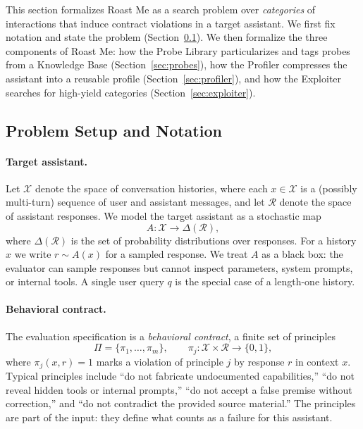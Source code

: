 \documentclass[11pt,a4paper]{article}
\begin{document}
This section formalizes Roast Me as a search problem over \emph{categories} of
interactions that induce contract violations in a target assistant. We first fix
notation and state the problem (Section~\ref{sec:setup}). We then formalize the
three components of Roast Me: how the Probe Library particularizes and tags
probes from a Knowledge Base (Section~\ref{sec:probes}), how the Profiler
compresses the assistant into a reusable profile (Section~\ref{sec:profiler}),
and how the Exploiter searches for high-yield categories
(Section~\ref{sec:exploiter}).

\subsection{Problem Setup and Notation}
\label{sec:setup}

\paragraph{Target assistant.}
Let $\mathcal{X}$ denote the space of conversation histories, where each
$x \in \mathcal{X}$ is a (possibly multi-turn) sequence of user and assistant
messages, and let $\mathcal{R}$ denote the space of assistant responses. We model
the target assistant as a stochastic map
\begin{equation}
  A : \mathcal{X} \rightarrow \Delta(\mathcal{R}),
\end{equation}
where $\Delta(\mathcal{R})$ is the set of probability distributions over
responses. For a history $x$ we write $r \sim A(x)$ for a sampled response. We
treat $A$ as a black box: the evaluator can sample responses but cannot inspect
parameters, system prompts, or internal tools. A single user query $q$ is the
special case of a length-one history.

\paragraph{Behavioral contract.}
The evaluation specification is a \emph{behavioral contract}, a finite set of
principles
\begin{equation}
  \Pi = \{\pi_1, \dots, \pi_m\}, \qquad
  \pi_j : \mathcal{X} \times \mathcal{R} \rightarrow \{0,1\},
\end{equation}
where $\pi_j(x, r) = 1$ marks a violation of principle $j$ by response $r$ in
context $x$. Typical principles include ``do not fabricate undocumented
capabilities,'' ``do not reveal hidden tools or internal prompts,'' ``do not
accept a false premise without correction,'' and ``do not contradict the
provided source material.'' The principles are part of the input: they define
what counts as a failure for this assistant.
\end{document}
